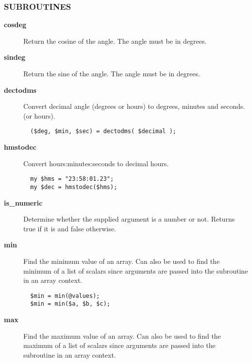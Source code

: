 \subsubsection*{SUBROUTINES\label{ORAC::General_SUBROUTINES}}
\begin{description}

\item[{\textbf{cosdeg}}] \mbox{}

Return the cosine of the angle. The angle must be in degrees.


\item[{\textbf{sindeg}}] \mbox{}

Return the sine of the angle. The angle must be in degrees.


\item[{\textbf{dectodms}}] \mbox{}

Convert decimal angle (degrees or hours) to degrees, minutes and seconds.
(or hours).

\begin{verbatim}
  ($deg, $min, $sec) = dectodms( $decimal );
\end{verbatim}

\item[{\textbf{hmstodec}}] \mbox{}

Convert hours:minutes:seconds to decimal hours.

\begin{verbatim}
  my $hms = "23:58:01.23";
  my $dec = hmstodec($hms);
\end{verbatim}

\item[{\textbf{is\_numeric}}] \mbox{}

Determine whether the supplied argument is a number or not.
Returns true if it is and false otherwise.


\item[{\textbf{min}}] \mbox{}

Find the minimum value of an array. Can also be used to find
the minimum of a list of scalars since arguments are passed into
the subroutine in an array context.

\begin{verbatim}
  $min = min(@values);
  $min = min($a, $b, $c);
\end{verbatim}

\item[{\textbf{max}}] \mbox{}

Find the maximum value of an array. Can also be used to find
the maximum of a list of scalars since arguments are passed into
the subroutine in an array context.


\end{description}
